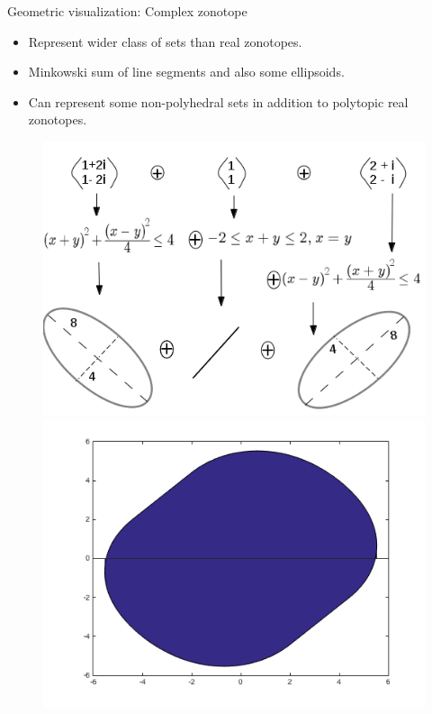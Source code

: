 \begin{frame}{Geometric visualization: Complex zonotope}
\begin{itemize}
\item Represent {\color{blue} wider class of sets} than {\color{purple} real zonotopes}.
\item {\color{blue} Minkowski sum} of {\color{purple}line segments}
and also {\color{blue} some ellipsoids}.
\item Can represent some {\color{blue} non-polyhedral} sets in
addition to {\color{purple} polytopic real zonotopes}.
\end{itemize}
%
\begin{figure}
\includegraphics[scale=0.45]{figures/complex-zonotope.png}
\includegraphics[scale=0.3]{figures/CZhull.png}
\end{figure}
%
\end{frame}

